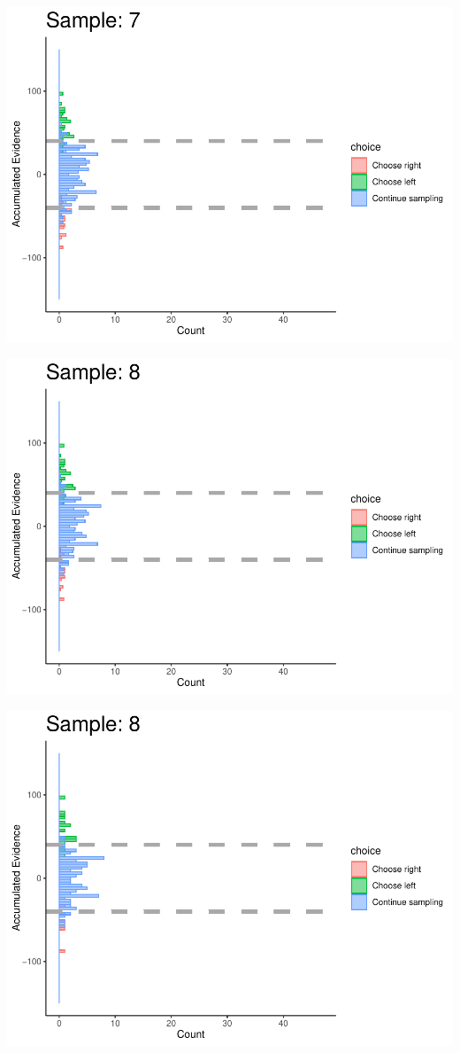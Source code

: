 \documentclass[
]{book}
\begin{document}
\begin{center}\includegraphics[width=0.8\linewidth]{LateNightBayes_files/figure-latex/collapsing_check-68} \end{center}

\begin{center}\includegraphics[width=0.8\linewidth]{LateNightBayes_files/figure-latex/collapsing_check-69} \end{center}

\begin{center}\includegraphics[width=0.8\linewidth]{LateNightBayes_files/figure-latex/collapsing_check-70} \end{center}
\end{document}
